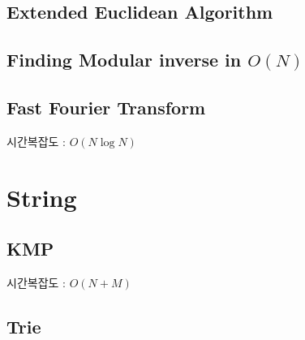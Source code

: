 \documentclass[10pt,landscape,a4paper,twocolumn]{article}
\begin{document}
\subsection{Extended Euclidean Algorithm}


\subsection{Finding Modular inverse in $O(N)$}


\subsection{Fast Fourier Transform}
시간복잡도 : $O(N\log{N})$


\iffalse
\subsection{Numeric Fast Fourier Transform}
시간복잡도 : $O(N\log{N})$

\fi



\section{String}
\subsection{KMP}
시간복잡도 : $O(N+M)$



\subsection{Trie}

\end{document}
